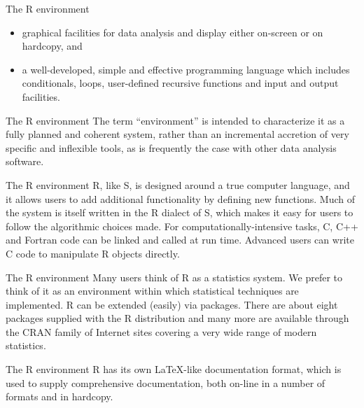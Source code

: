 \documentclass[
  ignorenonframetext,
]{beamer}
\providecommand{\tightlist}{%
  \setlength{\itemsep}{0pt}\setlength{\parskip}{0pt}}
\begin{document}
\begin{frame}{The R environment}
\protect\hypertarget{the-r-environment-1}{}
\begin{itemize}[<+->]
\tightlist
\item
  graphical facilities for data analysis and display either on-screen or
  on hardcopy, and
\item
  a well-developed, simple and effective programming language which
  includes conditionals, loops, user-defined recursive functions and
  input and output facilities.
\end{itemize}
\end{frame}

\begin{frame}{The R environment}
\protect\hypertarget{the-r-environment-2}{}
The term ``environment'' is intended to characterize it as a fully
planned and coherent system, rather than an incremental accretion of
very specific and inflexible tools, as is frequently the case with other
data analysis software.
\end{frame}

\begin{frame}{The R environment}
\protect\hypertarget{the-r-environment-3}{}
R, like S, is designed around a true computer language, and it allows
users to add additional functionality by defining new functions. Much of
the system is itself written in the R dialect of S, which makes it easy
for users to follow the algorithmic choices made. For
computationally-intensive tasks, C, C++ and Fortran code can be linked
and called at run time. Advanced users can write C code to manipulate R
objects directly.
\end{frame}

\begin{frame}{The R environment}
\protect\hypertarget{the-r-environment-4}{}
Many users think of R as a statistics system. We prefer to think of it
as an environment within which statistical techniques are implemented. R
can be extended (easily) via packages. There are about eight packages
supplied with the R distribution and many more are available through the
CRAN family of Internet sites covering a very wide range of modern
statistics.
\end{frame}

\begin{frame}{The R environment}
\protect\hypertarget{the-r-environment-5}{}
R has its own LaTeX-like documentation format, which is used to supply
comprehensive documentation, both on-line in a number of formats and in
hardcopy.
\end{frame}
\end{document}
